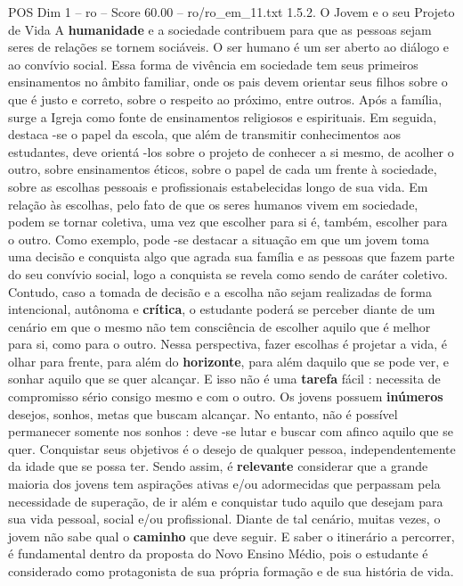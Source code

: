 \begin{textsample}{POS Dim 1 – ro – Score 60.00 – ro/ro\_em\_11.txt}  \label{ex:f1_pos_135}
1.5.2.
O Jovem e o seu Projeto de Vida A \textbf{humanidade} e a sociedade contribuem para que as pessoas sejam seres de relações se tornem sociáveis.
O ser humano é um ser aberto ao diálogo e ao convívio social.
Essa forma de vivência em sociedade tem seus primeiros ensinamentos no âmbito familiar, onde os pais devem orientar seus filhos sobre o que é justo e correto, sobre o respeito ao próximo, entre outros.
Após a família, surge a Igreja como fonte de ensinamentos religiosos e espirituais.
Em seguida, destaca -se o papel da escola, que além de transmitir conhecimentos aos estudantes, deve orientá -los sobre o projeto de conhecer a si mesmo, de acolher o outro, sobre ensinamentos éticos, sobre o papel de cada um frente à sociedade, sobre as escolhas pessoais e profissionais estabelecidas longo de sua vida.
Em relação às escolhas, pelo fato de que os seres humanos vivem em sociedade, podem se tornar coletiva, uma vez que escolher para si é, também, escolher para o outro.
Como exemplo, pode -se destacar a situação em que um jovem toma uma decisão e conquista algo que agrada sua família e as pessoas que fazem parte do seu convívio social, logo a conquista se revela como sendo de caráter coletivo.
Contudo, caso a tomada de decisão e a escolha não sejam realizadas de forma intencional, autônoma e \textbf{crítica}, o estudante poderá se perceber diante de um cenário em que o mesmo não tem consciência de escolher aquilo que é melhor para si, como para o outro.
Nessa perspectiva, fazer escolhas é projetar a vida, é olhar para frente, para além do \textbf{horizonte}, para além daquilo que se pode ver, e sonhar aquilo que se quer alcançar.
E isso não é uma \textbf{tarefa} fácil : necessita de compromisso sério consigo mesmo e com o outro.
Os jovens possuem \textbf{inúmeros} desejos, sonhos, metas que buscam alcançar.
No entanto, não é possível permanecer somente nos sonhos : deve -se lutar e buscar com afinco aquilo que se quer.
Conquistar seus objetivos é o desejo de qualquer pessoa, independentemente da idade que se possa ter.
Sendo assim, é \textbf{relevante} considerar que a grande maioria dos jovens tem aspirações ativas e/ou adormecidas que perpassam pela necessidade de superação, de ir além e conquistar tudo aquilo que desejam para sua vida pessoal, social e/ou profissional.
Diante de tal cenário, muitas vezes, o jovem não sabe qual o \textbf{caminho} que deve seguir.
E saber o itinerário a percorrer, é fundamental dentro da proposta do Novo Ensino Médio, pois o estudante é considerado como protagonista de sua própria formação e de sua história de vida.

\end{textsample}
